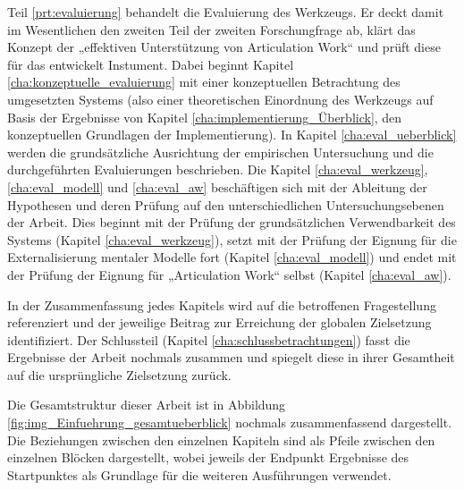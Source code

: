 Teil \ref{prt:evaluierung} behandelt die Evaluierung des Werkzeugs. Er deckt damit im Wesentlichen den zweiten Teil der zweiten Forschungfrage ab, klärt das Konzept der „effektiven Unterstützung von Articulation Work“ und prüft diese für das entwickelt Instument. Dabei beginnt Kapitel \ref{cha:konzeptuelle_evaluierung} mit einer konzeptuellen Betrachtung des umgesetzten Systems (also einer theoretischen Einordnung des Werkzeugs auf Basis der Ergebnisse von Kapitel \ref{cha:implementierung_Überblick}, den konzeptuellen Grundlagen der Implementierung). In Kapitel \ref{cha:eval_ueberblick} werden die grundsätzliche Ausrichtung der empirischen Untersuchung und die durchgeführten Evaluierungen beschrieben. Die Kapitel \ref{cha:eval_werkzeug}, \ref{cha:eval_modell} und \ref{cha:eval_aw} beschäftigen sich mit der Ableitung der Hypothesen und deren Prüfung auf den unterschiedlichen Untersuchungsebenen der Arbeit. Dies beginnt mit der Prüfung der grundsätzlichen Verwendbarkeit des Systems (Kapitel \ref{cha:eval_werkzeug}), setzt mit der Prüfung der Eignung für die Externalisierung mentaler Modelle fort (Kapitel \ref{cha:eval_modell}) und endet mit der Prüfung der Eignung für „Articulation Work“ selbst (Kapitel \ref{cha:eval_aw}).

In der Zusammenfassung jedes Kapitels wird auf die betroffenen Fragestellung referenziert und der jeweilige Beitrag zur Erreichung der globalen Zielsetzung identifiziert. Der Schlussteil (Kapitel \ref{cha:schlussbetrachtungen}) fasst die Ergebnisse der Arbeit nochmals zusammen und spiegelt diese in ihrer Gesamtheit auf die ursprüngliche Zielsetzung zurück.

Die Gesamtstruktur dieser Arbeit ist in Abbildung \ref{fig:img_Einfuehrung_gesamtueberblick} nochmals zusammenfassend dargestellt. Die Beziehungen zwischen den einzelnen Kapiteln sind als Pfeile zwischen den einzelnen Blöcken dargestellt, wobei jeweils der Endpunkt Ergebnisse des Startpunktes als Grundlage für die weiteren Ausführungen verwendet.

